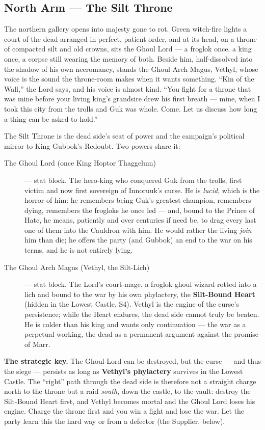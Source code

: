 \documentclass[10pt,twoside]{report}
\begin{document}
\subsection*{North Arm --- The Silt Throne}
\begin{readaloud}
The northern gallery opens into majesty gone to rot. Green witch-fire lights a court of the dead arranged in perfect, patient order, and at its head, on a throne of compacted silt and old crowns, sits the Ghoul Lord --- a froglok once, a king once, a corpse still wearing the memory of both. Beside him, half-dissolved into the shadow of his own necromancy, stands the Ghoul Arch Magus, Vethyl, whose voice is the sound the throne-room makes when it wants something. ``Kin of the Wall,'' the Lord says, and his voice is almost kind. ``You fight for a throne that was mine before your living king's grandsire drew his first breath --- mine, when I took this city from the trolls and Guk was whole. Come. Let us discuss how long a thing can be asked to hold.''
\end{readaloud}
The Silt Throne is the dead side's seat of power and the campaign's political mirror to King Gubbok's Redoubt. Two powers share it:
\begin{description}
\item[The Ghoul Lord (once King Hoptor Thaggelum)] --- stat block. The hero-king who conquered Guk from the trolls, first victim and now first sovereign of Innoruuk's curse. He is \emph{lucid}, which is the horror of him: he remembers being Guk's greatest champion, remembers dying, remembers the frogloks he once led --- and, bound to the Prince of Hate, he means, patiently and over centuries if need be, to drag every last one of them into the Cauldron with him. He would rather the living \emph{join} him than die; he offers the party (and Gubbok) an end to the war on his terms, and he is not entirely lying.
\item[The Ghoul Arch Magus (Vethyl, the Silt-Lich)] --- stat block. The Lord's court-mage, a froglok ghoul wizard rotted into a lich and bound to the war by his own phylactery, the \textbf{Silt-Bound Heart} (hidden in the Lowest Castle, S4). Vethyl is the engine of the curse's persistence; while the Heart endures, the dead side cannot truly be beaten. He is colder than his king and wants only continuation --- the war as a perpetual working, the dead as a permanent argument against the promise of Marr.
\end{description}

\begin{gmnote}
\textbf{The strategic key.} The Ghoul Lord can be destroyed, but the curse --- and thus the siege --- persists as long as \textbf{Vethyl's phylactery} survives in the Lowest Castle. The ``right'' path through the dead side is therefore not a straight charge north to the throne but a raid \emph{south}, down the castle, to the vault: destroy the Silt-Bound Heart first, and Vethyl becomes mortal and the Ghoul Lord loses his engine. Charge the throne first and you win a fight and lose the war. Let the party learn this the hard way or from a defector (the Supplier, below).
\end{gmnote}
\end{document}
